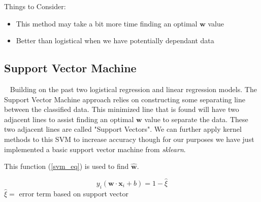 \documentclass{article}
\begin{document}
		Things to Consider:
		\begin{itemize}
			\item This method may take a bit more time finding an optimal $ \mathbf{\hat w} $ value
			\item Better than logistical when we have potentially dependant data
		\end{itemize}		
		
		\subsection{Support Vector Machine}~
				Building on the past two logistical regression and linear regression models. The Support Vector Machine approach relies on constructing some separating line between the classified data. This minimized line that is found will have two adjacent lines to assist finding an optimal $\mathbf{w} $ value to separate the data. These two adjacent lines are called "Support Vectors". We can further apply kernel methods to this SVM to increase accuracy though for our purposes we have just implemented a basic support vector machine from \emph{sklearn}.
				
				This function (\ref{svm_eq}) is used to find $\mathbf{\hat w}$.
				
				\begin{equation}\label{svm_eq}
					y_i(\mathbf{ w} \cdot \mathbf{x}_i + b) = 1-\hat\xi
				\end{equation}
				$ \hat \xi =$  error term based on support vector\\
				
\end{document}
